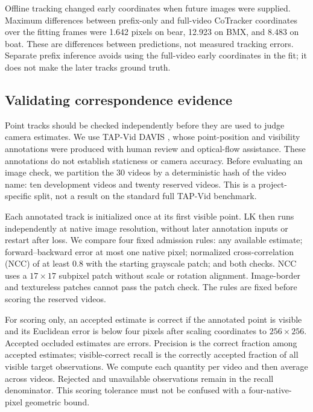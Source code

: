 \documentclass[10pt,twocolumn]{article}
\begin{document}
Offline tracking changed early coordinates when future images were supplied. Maximum differences between prefix-only and full-video CoTracker coordinates over the fitting frames were 1.642 pixels on bear, 12.923 on BMX, and 8.483 on boat. These are differences between predictions, not measured tracking errors. Separate prefix inference avoids using the full-video early coordinates in the fit; it does not make the later tracks ground truth.




\subsection{Validating correspondence evidence}
Point tracks should be checked independently before they are used to judge camera estimates. We use TAP-Vid DAVIS \cite{doersch2022tapvid}, whose point-position and visibility annotations were produced with human review and optical-flow assistance. These annotations do not establish staticness or camera accuracy. Before evaluating an image check, we partition the 30 videos by a deterministic hash of the video name: ten development videos and twenty reserved videos. This is a project-specific split, not a result on the standard full TAP-Vid benchmark.

Each annotated track is initialized once at its first visible point. LK then runs independently at native image resolution, without later annotation inputs or restart after loss. We compare four fixed admission rules: any available estimate; forward--backward error at most one native pixel; normalized cross-correlation (NCC) of at least 0.8 with the starting grayscale patch; and both checks. NCC uses a $17\times17$ subpixel patch without scale or rotation alignment. Image-border and textureless patches cannot pass the patch check. The rules are fixed before scoring the reserved videos.

For scoring only, an accepted estimate is correct if the annotated point is visible and its Euclidean error is below four pixels after scaling coordinates to $256\times256$. Accepted occluded estimates are errors. Precision is the correct fraction among accepted estimates; visible-correct recall is the correctly accepted fraction of all visible target observations. We compute each quantity per video and then average across videos. Rejected and unavailable observations remain in the recall denominator. This scoring tolerance must not be confused with a four-native-pixel geometric bound.
\end{document}
